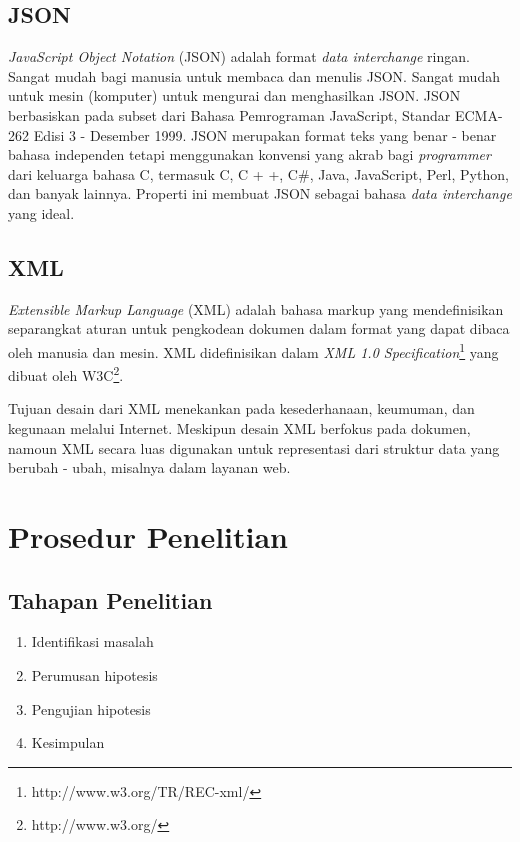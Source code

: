 \documentclass[a4paper, 12pt]{report}
\begin{document}
\subsection*{JSON}
\onehalfspacing \textit{JavaScript Object Notation} (JSON) adalah format \textit{data interchange} ringan. Sangat mudah bagi manusia untuk membaca dan menulis JSON. Sangat mudah untuk mesin (komputer) untuk mengurai dan menghasilkan JSON. JSON berbasiskan pada subset dari Bahasa Pemrograman JavaScript, Standar ECMA-262 Edisi 3 - Desember 1999. JSON merupakan format teks yang benar - benar bahasa independen tetapi menggunakan konvensi yang akrab bagi \textit{programmer} dari keluarga bahasa C, termasuk C, C + +, C\#, Java, JavaScript, Perl, Python, dan banyak lainnya. Properti ini membuat JSON sebagai bahasa \textit{data interchange} yang ideal\cite{introducing-json}.

\subsection*{XML}
\onehalfspacing \textit{Extensible Markup Language} (XML) adalah bahasa markup yang mendefinisikan separangkat aturan untuk pengkodean dokumen dalam format yang dapat dibaca oleh manusia dan mesin. XML didefinisikan dalam \textit{XML 1.0 Specification}\footnote{http://www.w3.org/TR/REC-xml/} yang dibuat oleh W3C\footnote{http://www.w3.org/}\cite{xml-on-wikipedia}.

\onehalfspacing Tujuan desain dari XML menekankan pada kesederhanaan, keumuman, dan kegunaan melalui Internet. Meskipun desain XML berfokus pada dokumen, namoun XML secara luas digunakan untuk representasi dari struktur data yang berubah - ubah, misalnya dalam layanan web\cite{xml-on-wikipedia}.

\section*{Prosedur Penelitian}

\subsection*{Tahapan Penelitian}

\begin{enumerate}
  \item Identifikasi masalah
  \item Perumusan hipotesis
  \item Pengujian hipotesis
  \item Kesimpulan
\end{enumerate}
\end{document}
